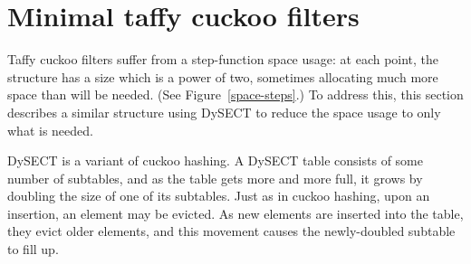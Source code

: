 \documentclass[letterpaper,twocolumn,10pt]{article}
\newcommand{\ints}{\mathbb{Z}}
\begin{document}






\section{Minimal taffy cuckoo filters}
\label{mtcf}

Taffy cuckoo filters suffer from a step-function space usage:
at each point, the structure has a size which is a power of two, sometimes allocating much more space than will be needed. (See Figure~\ref{space-steps}.)
To address this, this section describes a similar structure using DySECT to reduce the space usage to only what is needed.~\cite{dysect}

DySECT is a variant of cuckoo hashing.
A DySECT table consists of some number of subtables, and as the table gets more and more full, it grows by doubling the size of one of its subtables.
Just as in cuckoo hashing, upon an insertion, an element may be evicted.
As new elements are inserted into the table, they evict older elements, and this movement causes the newly-doubled subtable to fill up.
\end{document}
